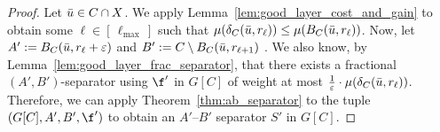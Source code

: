 \begin{proof}
    Let $\Bar{u}\in C\cap X$. We apply Lemma~\ref{lem:good_layer_cost_and_gain} to obtain some $\ell \in [\,\ell_{\max}\,]$ such that $\mu(\delta_C(\Bar{u}, r_\ell)) \leq \mu(B_C(\Bar{u}, r_\ell))$. Now, let $A' := B_C(\Bar{u}, r_\ell + \varepsilon)$ and $B' := C \setminus B_C(\Bar{u}, r_{\ell+1})$ .
    We also know, by Lemma~\ref{lem:good_layer_frac_separator}, that there exists a fractional $(A',B')$-separator using $\f'$ in $G[C]$ of weight at most $\frac{1}{\varepsilon}\cdot\mu(\delta_C(\Bar{u}, r_\ell))$. Therefore, we can apply Theorem~\ref{thm:ab_separator} to the tuple $(G[C], A', B', \f')$ to obtain an $A'$--$B'$ separator $S'$ in $G[C]$.
    

\end{proof}
